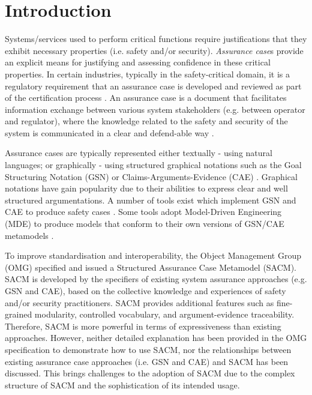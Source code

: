 \section{Introduction}
Systems/services used to perform critical functions require justifications that they exhibit necessary properties (i.e. safety and/or security). 
\textit{Assurance case}s provide an explicit means for justifying and assessing confidence in these critical properties. 
In certain industries, typically in the safety-critical domain, it is a regulatory requirement that an assurance case is developed and reviewed as part of the certification process \cite{healthFound}.
An assurance case is a document that facilitates information exchange between various system stakeholders (e.g. between operator and regulator), where the knowledge related to the safety and security of the system is communicated in a clear and defend-able way \cite{hawkins2013assurance}. 

Assurance cases are typically represented either textually - using natural languages; or graphically - using structured graphical notations such as the Goal Structuring Notation (GSN) \cite{kelly2004goal} or Claims-Arguments-Evidence (CAE) \cite{bishop2000methodology}. 
Graphical notations have gain popularity due to their abilities to express clear and well structured argumentations.
A number of tools exist which implement GSN and CAE to produce safety cases \cite{maksimov2018}. 
Some tools adopt Model-Driven Engineering (MDE) to produce models that conform to their own versions of GSN/CAE metamodels \cite{denney2017tool, matsuno2010dependability, netkachova2014tool, larrucea2017supporting, barry2011certware}.


To improve standardisation and interoperability, the Object Management Group (OMG) specified and issued a Structured Assurance Case Metamodel (SACM). 
SACM is developed by the specifiers of existing system assurance approaches (e.g. GSN and CAE), based on the collective knowledge and experiences of safety and/or security practitioners.
SACM provides additional features such as fine-grained modularity, controlled vocabulary, and argument-evidence traceability. 
Therefore, SACM is more powerful in terms of expressiveness than existing approaches. 
However, neither detailed explanation has been provided in the OMG specification to demonstrate how to use SACM, nor the relationships between existing assurance case approaches (i.e. GSN and CAE) and SACM has been discussed. 
This brings challenges to the adoption of SACM due to the complex structure of SACM and the sophistication of its intended usage. 

